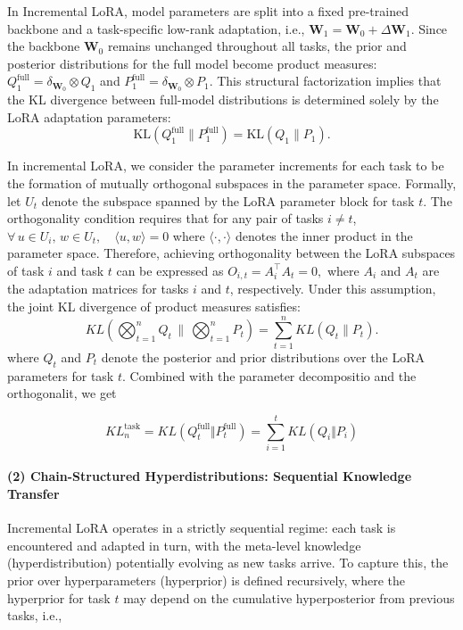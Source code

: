 \documentclass[letterpaper]{article} %
\begin{document}
In Incremental LoRA, model parameters are split into a fixed pre-trained backbone and a task-specific low-rank adaptation, i.e., $\boldsymbol{W}_1 = \boldsymbol{W}_0 + \Delta\boldsymbol{W}_1$. Since the backbone $\boldsymbol{W}_0$ remains unchanged throughout all tasks, the prior and posterior distributions for the full model become product measures: $Q_1^{\text{full}} = \delta_{\boldsymbol{W}_0} \otimes Q_1$ and $P_1^{\text{full}} = \delta_{\boldsymbol{W}_0} \otimes P_1$. This structural factorization implies that the KL divergence between full-model distributions is determined solely by the LoRA adaptation parameters:$$ \mathrm{KL}(Q_1^{\text{full}} \| P_1^{\text{full}}) = \mathrm{KL}(Q_1 \| P_1).$$


 In incremental LoRA, we consider the parameter increments for each task to be the formation of mutually orthogonal subspaces in the parameter space. Formally, let $U_t$ denote the subspace spanned by the LoRA parameter block for task $t$. The orthogonality condition requires that for any pair of tasks $i \neq t$,
$ \forall\, u \in U_i,\, w \in U_t, \quad \langle u, w \rangle = 0$
where $\langle \cdot, \cdot \rangle$ denotes the inner product in the parameter space. Therefore, achieving orthogonality between the LoRA subspaces of task $i$ and task $t$ can be expressed as
${O}_{i,t} = A_i^{\top} A_t = 0,$
where $A_i$ and $A_t$ are the adaptation matrices for tasks $i$ and $t$, respectively. Under this assumption, the joint KL divergence of product measures satisfies:   
$$
      KL\left(\bigotimes_{t=1}^n Q_t \, \bigg\| \, \bigotimes_{t=1}^n P_t\right) = \sum_{t=1}^n KL(Q_t \| P_t).
$$
where $Q_t$ and $P_t$ denote the posterior and prior distributions over the LoRA parameters for task $t$. 
Combined with the parameter decompositio and the orthogonalit, we get

\begin{equation}
 {KL}^{\text{task}}_n = {KL}\left(Q_t^{\text{full}} \Vert P_t^{\text{full}}\right) = \sum_{i=1}^t {KL}(Q_i \Vert P_i)
\end{equation}

\paragraph{(2) Chain-Structured Hyperdistributions: Sequential Knowledge Transfer}
Incremental LoRA operates in a strictly sequential regime: each task is encountered and adapted in turn, with the meta-level knowledge (hyperdistribution) potentially evolving as new tasks arrive. To capture this, the prior over hyperparameters (hyperprior) is defined recursively, where the hyperprior for task $t$ may depend on the cumulative hyperposterior from previous tasks, i.e.,
\end{document}
